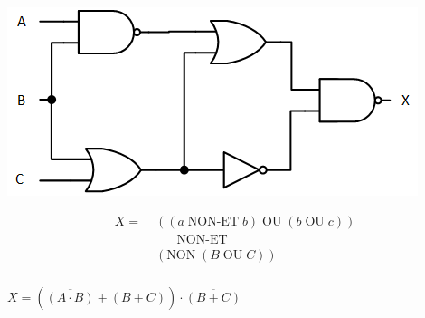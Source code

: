 \documentclass[11pt,a4paper]{article}
\begin{document}
\smallskip

\begin{table}[!ht]
  \centering
  \begin{minipage}{0.55\textwidth}
    \centering

\includegraphics[scale=1.5]{./img/circuit_logique_A.png}

  \end{minipage}
  \hfillx
  \begin{minipage}{0.45\textwidth}
    \centering


\begin{equation*}
    \begin{split}
X = \; & ((a \; \text{NON-ET} \; b) \; \text{OU} \; (b \; \text{OU} \; c)) \\
    &     \; \; \; \; \; \; \text{NON-ET} \\
    & (\text{NON} \; (B \; \text{OU} \; C)) \\
    \end{split}
\end{equation*}

\bigskip

$ X = \overline{(\overline{(A \cdot B)} + (B + C)) \cdot \overline{(B + C)}} $

  \end{minipage}
\end{table}



\bigskip


\end{document}

